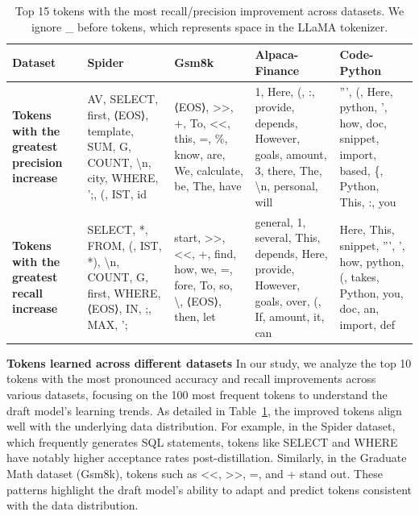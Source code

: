 

\begin{table}[h!]
\vspace{-10pt}
\caption{Top 15 tokens with the most recall/precision improvement across datasets. We ignore \_ before tokens, which represents space in the LLaMA tokenizer.}
\label{tab:tokens}
\begin{center}
\begin{footnotesize}
\begin{tabular}{p{1.5cm}|p{2.4cm}|p{2.4cm}|p{2.4cm}|p{2.4cm}}
\toprule
{\bf Dataset} & {\bf Spider} & {\bf Gsm8k} & {\bf Alpaca-Finance} & {\bf Code-Python} \\
\midrule
{\bf Tokens with the greatest precision increase}
&
AV, SELECT, first, ⟨EOS⟩, template, SUM, G, COUNT, \textbackslash n, city, WHERE, ';, (, IST, id
&
⟨EOS⟩, \textgreater\textgreater, +, To, \textless\textless, this, =, \%, know, are, We, calculate, be, The, have
&
1, Here, (, :, provide, depends, However, goals, amount, 3, there, The, \textbackslash n, personal, will
&
''', (, Here, python, ', how, doc, snippet, import, based, \{, Python, This, :, you \\
\hline
{\bf Tokens with the greatest recall increase}
&
SELECT, *, FROM, (, IST, *), \textbackslash n, COUNT, G, first, WHERE, ⟨EOS⟩, IN, ;, MAX, ';
&
start, \textgreater\textgreater, \textless\textless, +, find, how, we, =, fore, To, so, \textbackslash, ⟨EOS⟩, then, let
&
general, 1, several, This, depends, Here, provide, However, goals, over, (, If, amount, it, can
&
Here, This, snippet, ''', ', how, python, (, takes, Python, you, doc, an, import, def \\
\bottomrule
\end{tabular}
\end{footnotesize}
\end{center}
\vspace{-10pt}
\end{table}

{\bf Tokens learned across different datasets}
In our study, we analyze the top 10 tokens with the most pronounced accuracy and recall improvements across various datasets, focusing on the 100 most frequent tokens to 
understand the draft model's learning trends. As detailed in Table~\ref{tab:tokens}, the improved tokens align well with the underlying data distribution. 
For example, in the Spider dataset, which frequently generates SQL statements, tokens like SELECT and WHERE have notably higher acceptance rates post-distillation. 
Similarly, in the Graduate Math dataset (Gsm8k), tokens such as \textless\textless, \textgreater\textgreater, =, and + stand out. 
These patterns highlight the draft model's ability to adapt and predict tokens consistent with the data distribution.



